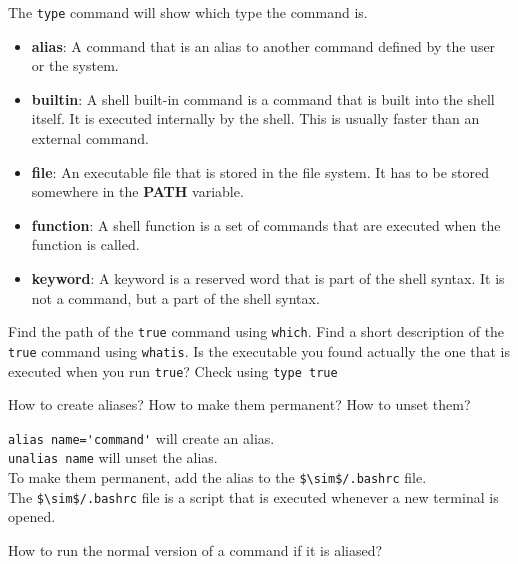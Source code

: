 The \lstinline|type| command will show which type the command is.
\begin{itemize}
  \item \textbf{alias}: A command that is an alias to another command defined
    by the user or the system.
  \item \textbf{builtin}: A shell built-in command is a command that is built
    into the shell itself. It is executed internally by the shell.
    This is usually faster than an external command.
  \item \textbf{file}: An executable file that is stored in the file system.
    It has to be stored somewhere in the \textbf{PATH} variable.
  \item \textbf{function}: A shell function is a set of commands that are
    executed when the function is called.
  \item \textbf{keyword}: A keyword is a reserved word that is part of the shell
    syntax. It is not a command, but a part of the shell syntax.
\end{itemize}

\begin{exercise}
  Find the path of the \lstinline|true| command using \lstinline|which|.
  Find a short description of the \lstinline|true| command using \lstinline|whatis|.
  Is the executable you found actually the one that is executed when you run \lstinline|true|? Check using \lstinline|type true|
\end{exercise}



\begin{qs}
  How to create aliases? How to make them permanent? How to unset them?
\end{qs}

\begin{ans}
  \lstinline|alias name='command'| will create an alias. \\
  \lstinline|unalias name| will unset the alias. \\
  To make them permanent, add the alias to the \lstinline|$\sim$/.bashrc| file. \\
  The \lstinline|$\sim$/.bashrc| file is a script that is executed whenever a new terminal is opened.
\end{ans}

\begin{qs}
  How to run the normal version of a command if it is aliased?
\end{qs}

